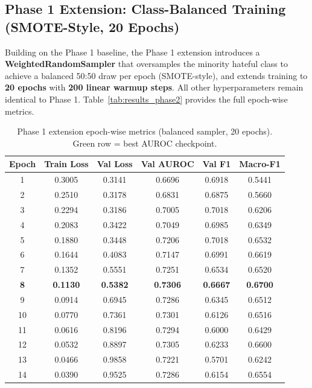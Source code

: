\documentclass[12pt,a4paper]{article}
\begin{document}
\subsection{Phase 1 Extension: Class-Balanced Training (SMOTE-Style, 20 Epochs)}
\label{subsec:phase1ext}

Building on the Phase 1 baseline, the Phase 1 extension introduces a \textbf{WeightedRandomSampler} that oversamples the minority hateful class to achieve a balanced 50:50 draw per epoch (SMOTE-style), and extends training to \textbf{20 epochs} with \textbf{200 linear warmup steps}. All other hyperparameters remain identical to Phase 1. Table~\ref{tab:results_phase2} provides the full epoch-wise metrics.

\begin{table}[H]
  \centering
  \caption{Phase 1 extension epoch-wise metrics (balanced sampler, 20 epochs). Green row = best AUROC checkpoint.}
  \renewcommand{\arraystretch}{1.15}
  \begin{tabular}{cccccc}
    \toprule
    \rowcolor{primaryblue!15}
    \textbf{Epoch} & \textbf{Train Loss} & \textbf{Val Loss} & \textbf{Val AUROC} & \textbf{Val F1} & \textbf{Macro-F1} \\
    \midrule
    1  & 0.3005 & 0.3141 & 0.6696 & 0.6918 & 0.5441 \\
    2  & 0.2510 & 0.3178 & 0.6831 & 0.6875 & 0.5660 \\
    3  & 0.2294 & 0.3186 & 0.7005 & 0.7018 & 0.6206 \\
    4  & 0.2083 & 0.3422 & 0.7049 & 0.6985 & 0.6349 \\
    5  & 0.1880 & 0.3448 & 0.7206 & 0.7018 & 0.6532 \\
    6  & 0.1644 & 0.4083 & 0.7147 & 0.6991 & 0.6619 \\
    7  & 0.1352 & 0.5551 & 0.7251 & 0.6534 & 0.6520 \\
    \rowcolor{successgreen!20}
    \textbf{8}  & \textbf{0.1130} & \textbf{0.5382} & \textbf{0.7306} & \textbf{0.6667} & \textbf{0.6700} \\
    9  & 0.0914 & 0.6945 & 0.7286 & 0.6345 & 0.6512 \\
    10 & 0.0770 & 0.7361 & 0.7301 & 0.6126 & 0.6516 \\
    11 & 0.0616 & 0.8196 & 0.7294 & 0.6000 & 0.6429 \\
    12 & 0.0532 & 0.8897 & 0.7305 & 0.6233 & 0.6600 \\
    13 & 0.0466 & 0.9858 & 0.7221 & 0.5701 & 0.6242 \\
    14 & 0.0390 & 0.9525 & 0.7286 & 0.6154 & 0.6554 \\

\end{tabular}
\end{table}
\end{document}
